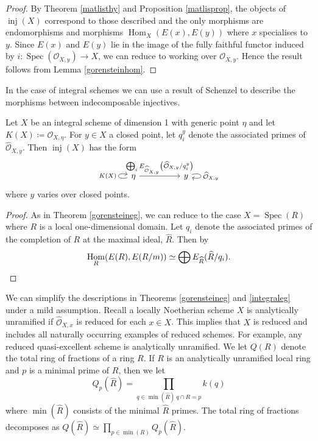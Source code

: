 \documentclass[12pt,oneside]{amsart}
\DeclareMathOperator{\Hom}{Hom}
\DeclareMathOperator{\inj}{inj}
\DeclareMathOperator{\Spec}{Spec}
\begin{document}
\begin{proof}
By Theorem \ref{matlisthy} and Proposition \ref{matlisprop}, the objects of $\inj(X)$ correspond to those described and the only morphisms are endomorphisms and morphisms $\Hom_X(E(x),E(y))$ where $x$ specialises to $y$. Since $E(x)$ and $E(y)$ lie in the image of the fully faithful functor induced by $i: \Spec(\mathcal{O}_{X,y}) \to X$, we can reduce to working over $\mathcal{O}_{X,y}$. Hence the result follows from Lemma \ref{gorensteinhom}.
\end{proof}


In the case of integral schemes we can use a result of Schenzel to describe the morphisms between indecomposable injectives.

\begin{theorem} \label{integraleg}
Let $X$ be an integral scheme of dimension 1 with generic point $\eta$ and let $K(X) \coloneq \mathcal{O}_{X,\eta}$. For $y \in X$ a closed point, let $q^{y}_i$ denote the associated primes of $\widehat{\mathcal{O}}_{X,y}$. Then $\inj(X)$ has the form 
\[
\begin{tikzcd}[column sep = huge]
\eta \arrow[r,"{\bigoplus_i E_{\widehat{\mathcal{O}}_{X,y}}\left(\widehat{\mathcal{O}}_{X,y}/q^y_i\right)}"] \arrow[loop left,"K(X)"] & y \arrow[loop right, "\widehat{\mathcal{O}}_{X,y}"]
\end{tikzcd}
\]
where $y$ varies over closed points.
\end{theorem}

\begin{proof}
As in Theorem \ref{gorensteineg}, we can reduce to the case $X = \Spec(R)$ where $R$ is a local one-dimensional domain. Let $q_i$ denote the associated primes of the completion of $R$ at the maximal ideal, $\widehat{R}$. Then by \cite[Theorem 2.5]{Sch15}
\[
\Hom_R(E(R),E(R/m)) \simeq \bigoplus E_{\widehat{R}}(\widehat{R}/q_i). \qedhere
\]
\end{proof}

\begin{remark}
We can simplify the descriptions in Theorems \ref{gorensteineg} and \ref{integraleg} under a mild assumption. Recall a locally Noetherian scheme $X$ is analytically unramified if $\widehat{\mathcal{O}}_{X,x}$ is reduced for each $x \in X$. This implies that $X$ is reduced and includes all naturally occurring examples of reduced schemes. For example, any reduced quasi-excellent scheme is analytically unramified. We let $Q(R)$ denote the total ring of fractions of a ring $R$. If $R$ is an analytically unramified local ring and $p$ is a minimal prime of $R$, then we let
\[
Q_p(\widehat{R}) = \prod_{q \in \min(\widehat{R})  \ q \cap R = p} k(q) 
\]
where $\min(\widehat{R})$ consists of the minimal $\widehat{R}$ primes. The total ring of fractions decomposes as $Q(\widehat{R}) \simeq \prod_{p \in \min(R)} Q_p(\widehat{R})$.
\end{remark}
\end{document}
